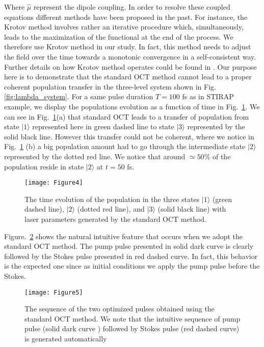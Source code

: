 \documentclass[]{interact}
\theoremstyle{plain}%
\theoremstyle{definition}
\theoremstyle{remark}
\begin{document}
Where $\hat\mu$ represent the dipole coupling.
In order to resolve these coupled equations different methods have been 
proposed \cite{Rabitz1, Palao2} in the past. For instance, the Krotov method 
involves 
rather an 
iterative procedure which, simultaneously, leads to the maximization of the 
functional at the end of the process. We therefore use Krotov method in our 
study. In 
fact, this method needs to adjust the field over the time towards a monotonic 
convergence in a self-consistent way. Further details on how Krotov method 
operates could be found in \cite{Tannor2, Somloi, Palao2}.
Our purpose here is to demonstrate that the standard OCT method cannot lead to 
a proper coherent 
population transfer in the three-level system shown in Fig. 
\ref{fig:lambda_system}. 
For a same pulse duration $T=100$ fs as in STIRAP example, we display the  
populations evolution as a function of time in 
Fig.~\ref{fig:Populations-OCT-Standard}. We can see in 
Fig.~\ref{fig:Populations-OCT-Standard}(a) that standard OCT leads to 
a transfer of population from state $|1\rangle$ represented here in 
green dashed line to state $|3\rangle$ represented by the solid black 
line. However this transfer could not be coherent, where we notice in 
Fig.~\ref{fig:Populations-OCT-Standard} (b) a big 
population amount had to go through the intermediate state $|2\rangle$ 
represented by the dotted red line. We notice that around $\simeq50\%$ of the 
population reside in state $|2\rangle$ at $t=50$ fs.
\begin{figure}[h!]
\centering
\texttt{[image: Figure4]}
\caption{The time evolution of the population in the three states $|1\rangle$ 
(green dashed line), 
$|2\rangle$ (dotted red line), and $|3\rangle$ (solid black line) with laser 
parameters generated by the standard OCT method.
\label{fig:Populations-OCT-Standard}}
\end{figure}
Figure.~\ref{fig:Pulses-OCT-Standard} shows the natural intuitive feature 
that occurs when we adopt the standard OCT method. The pump pulse 
presented in solid dark curve is clearly followed by the Stokes pulse presented 
in red dashed curve. In fact, this behavior is the expected one since as 
initial 
conditions we apply the pump pulse before the Stokes.
\begin{figure}[h!] 
\centering
\texttt{[image: Figure5]}
\caption{The sequence of the two optimized pulses obtained 
using the standard OCT method. We note that the intuitive sequence 
of pump pulse (solid dark curve ) followed by Stokes pulse (red dashed curve) 
is generated automatically  
\label{fig:Pulses-OCT-Standard}}
\end{figure}
\end{document}
